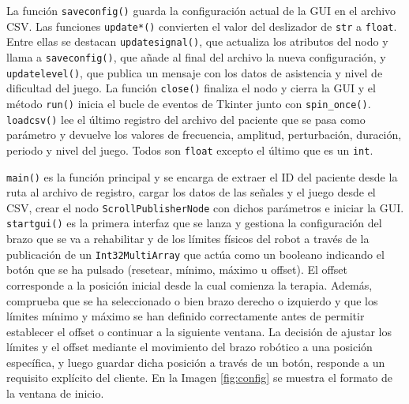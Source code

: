 La función \verb|saveconfig()| guarda la configuración actual de la GUI en el archivo CSV.
Las funciones \verb|update*()| convierten el valor del deslizador de \verb|str| a \verb|float|.
Entre ellas se destacan \verb|updatesignal()|, que actualiza los atributos del nodo y llama a \verb|saveconfig()|, que añade al final del archivo la nueva configuración, y \verb|updatelevel()|, que publica un mensaje con los datos de asistencia y nivel de dificultad del juego.
La función \verb|close()| finaliza el nodo y cierra la GUI y el método \verb|run()| inicia el bucle de eventos de Tkinter junto con \verb|spin_once()|.
\verb|loadcsv()| lee el último registro del archivo del paciente que se pasa como parámetro y devuelve los valores de frecuencia, amplitud, perturbación, duración, periodo y nivel del juego.
Todos son \verb|float| excepto el último que es un \verb|int|.

\verb|main()| es la función principal y se encarga de extraer el ID del paciente desde la ruta al archivo de registro, cargar los datos de las señales y el juego desde el CSV, crear el nodo \verb|ScrollPublisherNode| con dichos parámetros e iniciar la GUI.
\verb|startgui()| es la primera interfaz que se lanza y gestiona la configuración del brazo que se va a rehabilitar y de los límites físicos del robot a través de la publicación de un \verb|Int32MultiArray| que actúa como un booleano indicando el botón que se ha pulsado (resetear, mínimo, máximo u offset).
El offset corresponde a la posición inicial desde la cual comienza la terapia.
Además, comprueba que se ha seleccionado o bien brazo derecho o izquierdo y que los límites mínimo y máximo se han definido correctamente antes de permitir establecer el offset o continuar a la siguiente ventana.
La decisión de ajustar los límites y el offset mediante el movimiento del brazo robótico a una posición específica, y luego guardar dicha posición a través de un botón, responde a un requisito explícito del cliente.
En la Imagen \ref{fig:config} se muestra el formato de la ventana de inicio.

